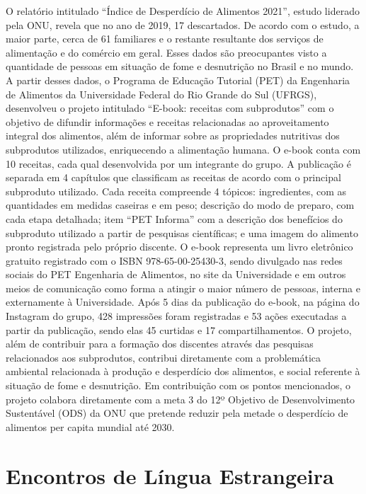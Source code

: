 O relatório intitulado “Índice de Desperdício de Alimentos 2021”, estudo liderado pela
ONU, revela que no ano de 2019, 17%
descartados. De acordo com o estudo, a maior parte, cerca de 61%
familiares e o restante resultante dos serviços de alimentação e do comércio em geral. Esses
dados são preocupantes visto a quantidade de pessoas em situação de fome e desnutrição no
Brasil e no mundo. A partir desses dados, o Programa de Educação Tutorial (PET) da Engenharia
de Alimentos da Universidade Federal do Rio Grande do Sul (UFRGS), desenvolveu o projeto
intitulado “E-book: receitas com subprodutos” com o objetivo de difundir informações e receitas
relacionadas ao aproveitamento integral dos alimentos, além de informar sobre as propriedades
nutritivas dos subprodutos utilizados, enriquecendo a alimentação humana. O e-book conta com
10 receitas, cada qual desenvolvida por um integrante do grupo. A publicação é separada em 4
capítulos que classificam as receitas de acordo com o principal subproduto utilizado. Cada
receita compreende 4 tópicos: ingredientes, com as quantidades em medidas caseiras e em peso;
descrição do modo de preparo, com cada etapa detalhada; item “PET Informa” com a descrição
dos benefícios do subproduto utilizado a partir de pesquisas científicas; e uma imagem do
alimento pronto registrada pelo próprio discente. O e-book representa um livro eletrônico
gratuito registrado com o ISBN 978-65-00-25430-3, sendo divulgado nas redes sociais do PET
Engenharia de Alimentos, no site da Universidade e em outros meios de comunicação como
forma a atingir o maior número de pessoas, interna e externamente à Universidade. Após 5 dias
da publicação do e-book, na página do Instagram do grupo, 428 impressões foram registradas e
53 ações executadas a partir da publicação, sendo elas 45 curtidas e 17 compartilhamentos. O
projeto, além de contribuir para a formação dos discentes através das pesquisas relacionados aos
subprodutos, contribui diretamente com a problemática ambiental relacionada à produção e
desperdício dos alimentos, e social referente à situação de fome e desnutrição. Em contribuição
com os pontos mencionados, o projeto colabora diretamente com a meta 3 do 12º Objetivo de
Desenvolvimento Sustentável (ODS) da ONU que pretende reduzir pela metade o desperdício de
alimentos per capita mundial até 2030.



\section{Encontros de Língua Estrangeira}

